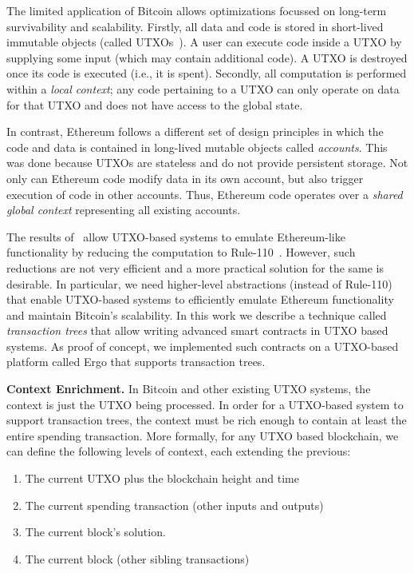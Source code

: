\documentclass[runningheads]{llncs}
\begin{document}
The limited application of Bitcoin allows optimizations focussed on long-term survivability and scalability. Firstly, all data and code is stored in short-lived immutable objects (called UTXOs~\cite{utxo}). A user can execute code inside a UTXO by supplying some input (which may contain additional code). A UTXO is destroyed once its code is executed (i.e., it is spent). Secondly, all computation is performed within a {\em local context}; any code pertaining to a UTXO can only operate on data for that UTXO and does not have access to the global state. 

In contrast, Ethereum follows a different set of design principles in which the code and data is contained in long-lived mutable objects called {\em accounts}. This was done because UTXOs are stateless and do not provide persistent storage. 
Not only can Ethereum code modify data in its own account, but also trigger execution of code in other accounts. Thus, Ethereum code operates over a {\em shared global context} representing all existing accounts. 

The results of~\cite{CKM18a} allow UTXO-based systems to emulate Ethereum-like functionality by reducing the computation to Rule-110~\cite{Cook_2009,neary2006p}. However, such reductions are not very efficient and a more practical solution for the same is desirable. 
In particular, we need higher-level abstractions (instead of Rule-110) that enable UTXO-based systems to efficiently emulate Ethereum functionality and maintain Bitcoin's scalability. 
In this work we describe a technique called {\em transaction trees} that allow writing advanced smart contracts in UTXO based systems. As proof of concept, we implemented such contracts on a UTXO-based platform called Ergo that supports transaction trees.

\textbf{Context Enrichment.} In Bitcoin and other existing UTXO systems, the context is just the UTXO being processed. In order for a UTXO-based system to support transaction trees, the context must be rich enough to contain at least the entire spending transaction. More formally, 
for any UTXO based blockchain, we can define the following levels of context, each extending the previous:
\begin{enumerate}
	\item The current UTXO plus the blockchain height and time
	\item The current spending transaction (other inputs and outputs)
	\item The current block's solution.
	\item The current block (other sibling transactions)
\end{enumerate}
\end{document}
